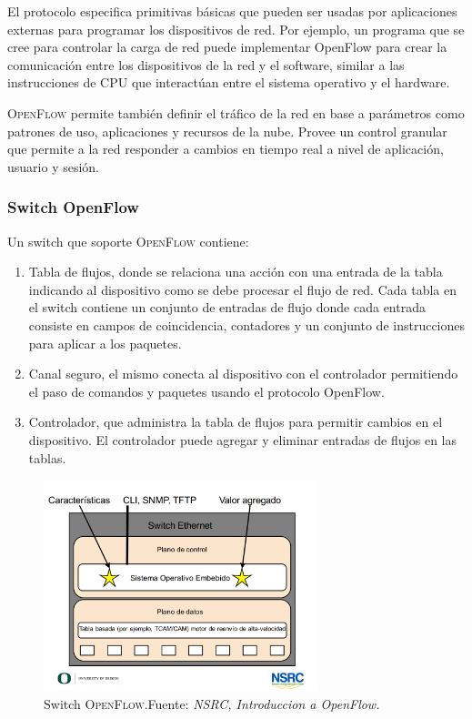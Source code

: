 \documentclass[10pt,journal,compsoc]{IEEEtran}
\begin{document}
El protocolo especifica primitivas básicas que pueden ser usadas por aplicaciones externas para programar los dispositivos de  red. Por ejemplo, un programa que se cree para controlar la carga de red puede implementar OpenFlow para crear la comunicación entre los dispositivos de la red y el software, similar a las instrucciones de CPU que interactúan entre el sistema operativo y el hardware. 

\textsc{OpenFlow} permite también definir el tráfico de la red en base a parámetros como patrones de uso, aplicaciones y recursos de la nube. Provee un control granular que permite a la red responder a cambios en tiempo real a nivel de aplicación, usuario y sesión. 


\subsubsection{Switch OpenFlow}

Un switch que soporte \textsc{OpenFlow} contiene:
\begin{enumerate}
    \item Tabla de flujos, donde se relaciona una acción con una entrada de la tabla indicando al dispositivo como se debe procesar el flujo de red. Cada tabla en el switch contiene un conjunto de entradas de flujo donde cada entrada consiste en campos de coincidencia, contadores y un conjunto de instrucciones para aplicar a los paquetes.
    \item Canal seguro, el mismo conecta al dispositivo con el controlador permitiendo el paso de comandos y paquetes usando el protocolo OpenFlow.
    \item Controlador, que administra la tabla de flujos para permitir cambios en el dispositivo. El controlador puede agregar y eliminar entradas de flujos en las tablas. 
\end{enumerate}

\begin{figure}[h]
    \centering
    \includegraphics[width=8cm]{openFlow3}
    \caption{Switch \textsc{OpenFlow}.Fuente: \emph{NSRC, Introduccion a OpenFlow.}}
    \label{fig:Arquitectura OpenFlow}
\end{figure}
\end{document}
